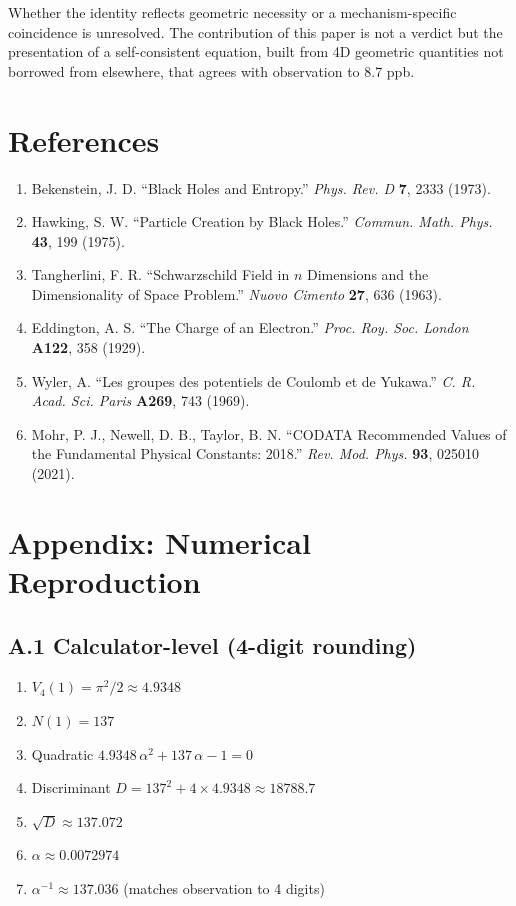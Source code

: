 \documentclass[a4paper,11pt]{article}
\begin{document}
Whether the identity reflects geometric necessity or a mechanism-specific coincidence is unresolved. The contribution of this paper is not a verdict but the presentation of a self-consistent equation, built from 4D geometric quantities not borrowed from elsewhere, that agrees with observation to 8.7 ppb.

\section*{References}

\begin{enumerate}
\item Bekenstein, J. D. ``Black Holes and Entropy.'' \textit{Phys. Rev. D} \textbf{7}, 2333 (1973).
\item Hawking, S. W. ``Particle Creation by Black Holes.'' \textit{Commun. Math. Phys.} \textbf{43}, 199 (1975).
\item Tangherlini, F. R. ``Schwarzschild Field in $n$ Dimensions and the Dimensionality of Space Problem.'' \textit{Nuovo Cimento} \textbf{27}, 636 (1963).
\item Eddington, A. S. ``The Charge of an Electron.'' \textit{Proc. Roy. Soc. London} \textbf{A122}, 358 (1929).
\item Wyler, A. ``Les groupes des potentiels de Coulomb et de Yukawa.'' \textit{C. R. Acad. Sci. Paris} \textbf{A269}, 743 (1969).
\item Mohr, P. J., Newell, D. B., Taylor, B. N. ``CODATA Recommended Values of the Fundamental Physical Constants: 2018.'' \textit{Rev. Mod. Phys.} \textbf{93}, 025010 (2021).
\end{enumerate}

\section*{Appendix: Numerical Reproduction}

\subsection*{A.1 Calculator-level (4-digit rounding)}

\begin{enumerate}
\item $V_4(1) = \pi^2/2 \approx 4.9348$
\item $N(1) = 137$
\item Quadratic $4.9348\, \alpha^2 + 137\, \alpha - 1 = 0$
\item Discriminant $D = 137^2 + 4 \times 4.9348 \approx 18788.7$
\item $\sqrt{D} \approx 137.072$
\item $\alpha \approx 0.0072974$
\item $\alpha^{-1} \approx 137.036$ (matches observation to 4 digits)
\end{enumerate}
\end{document}
